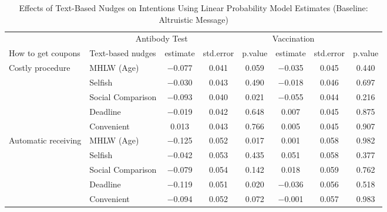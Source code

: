 \begin{table}

\caption{Effects of Text-Based Nudges on Intentions Using Linear Probability Model Estimates (Baseline: Altruistic Message) \label{tab:int-reg-ftest2}}
\centering
\begin{tabular}[t]{>{\raggedright\arraybackslash}p{5em}lcccccc}
\toprule
\multicolumn{2}{c}{ } & \multicolumn{3}{c}{Antibody Test} & \multicolumn{3}{c}{Vaccination} \\
\cmidrule(l{3pt}r{3pt}){3-5} \cmidrule(l{3pt}r{3pt}){6-8}
How to get coupons & Text-based nudges & estimate & std.error & p.value & estimate  & std.error  & p.value \\
\midrule
Costly procedure & MHLW (Age) & \num{-0.077} & \num{0.041} & \num{0.059} & \num{-0.035} & \num{0.045} & \num{0.440}\\
 & Selfish & \num{-0.030} & \num{0.043} & \num{0.490} & \num{-0.018} & \num{0.046} & \num{0.697}\\
 & Social Comparison & \num{-0.093} & \num{0.040} & \num{0.021} & \num{-0.055} & \num{0.044} & \num{0.216}\\
 & Deadline & \num{-0.019} & \num{0.042} & \num{0.648} & \num{0.007} & \num{0.045} & \num{0.875}\\
 & Convenient & \num{0.013} & \num{0.043} & \num{0.766} & \num{0.005} & \num{0.045} & \num{0.907}\\
Automatic receiving & MHLW (Age) & \num{-0.125} & \num{0.052} & \num{0.017} & \num{0.001} & \num{0.058} & \num{0.982}\\
 & Selfish & \num{-0.042} & \num{0.053} & \num{0.435} & \num{0.051} & \num{0.058} & \num{0.377}\\
 & Social Comparison & \num{-0.079} & \num{0.054} & \num{0.142} & \num{0.018} & \num{0.059} & \num{0.762}\\
 & Deadline & \num{-0.119} & \num{0.051} & \num{0.020} & \num{-0.036} & \num{0.056} & \num{0.518}\\
 & Convenient & \num{-0.094} & \num{0.052} & \num{0.072} & \num{-0.001} & \num{0.057} & \num{0.983}\\
\bottomrule
\end{tabular}
\end{table}

